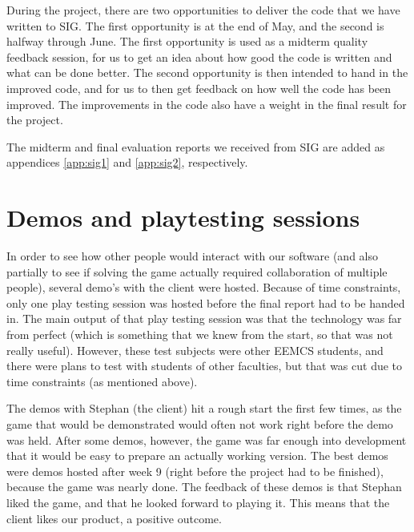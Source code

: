         During the project, there are two opportunities to deliver the code 
        that we have written to SIG. The first opportunity is at the end of 
        May, and the second is halfway through June. The first opportunity 
        is used as a midterm quality feedback session, for us to get an idea 
        about how good the code is written and what can be done better. The 
        second opportunity is then intended to hand in the improved code, 
        and for us to then get feedback on how well the code has been improved. 
        The improvements in the code also have a weight in the final result 
        for the project.
        
        The midterm and final evaluation reports we received from SIG are added
        as appendices \ref{app:sig1} and \ref{app:sig2}, respectively.
        
    \section{Demos and playtesting sessions} \label{sec:demos}
        In order to see how other people would interact with our software (and
        also partially to see if solving the game actually required
        collaboration of multiple people), several demo's with the client were
        hosted. Because of time constraints, only one play testing session was
        hosted before the final report had to be handed in. The main output of
        that play testing session was that the technology was far from perfect
        (which is something that we knew from the start, so that was not really
        useful). However, these test subjects were other EEMCS students, and
        there were plans to test with students of other faculties, but that was
        cut due to time constraints (as mentioned above).
        
        The demos with Stephan (the client) hit a rough start the first few 
        times, as the game that would be demonstrated would often not work right
        before the demo was held. After some demos, however, the game was far
        enough into development that it would be easy to prepare an actually
        working version. The best demos were demos hosted after week 9 (right
        before the project had to be finished), because the game was nearly
        done. The feedback of these demos is that Stephan liked the game, and
        that he looked forward to playing it. This means that the client likes
        our product, a positive outcome.